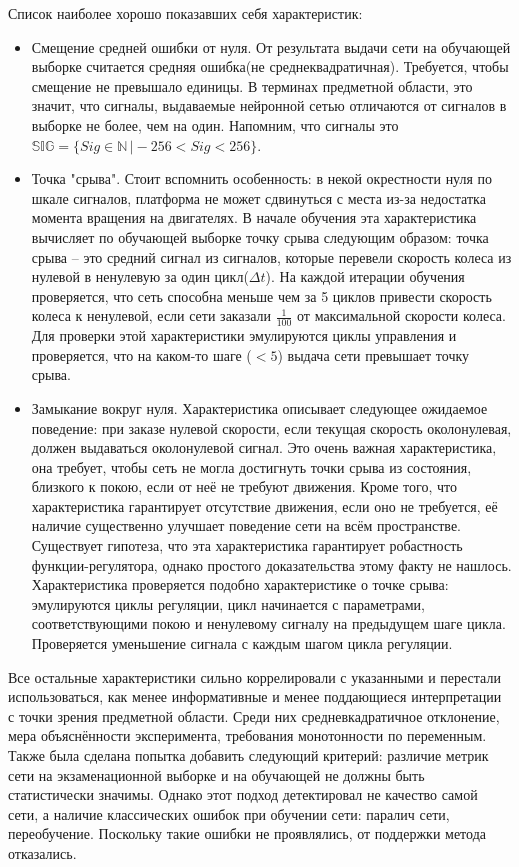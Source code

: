 \documentclass[14pt]{extreport}
\begin{document}
                Список наиболее хорошо показавших себя характеристик:
                    \begin{itemize}
                      \item Смещение средней ошибки от нуля. От результата выдачи сети на обучающей выборке считается средняя ошибка(не среднеквадратичная). Требуется, чтобы смещение не превышало единицы. В терминах предметной области, это значит, что сигналы, выдаваемые нейронной сетью отличаются от сигналов в выборке не более, чем на один. Напомним, что сигналы это $\mathbb{SIG} = \{Sig \in \mathbb{N}\,\vert -256 < Sig < 256\}$.
                      \item Точка "срыва". Стоит вспомнить особенность: в некой окрестности нуля по шкале сигналов, платформа не может сдвинуться с места из-за недостатка момента вращения на двигателях. В начале обучения эта характеристика вычисляет по обучающей выборке точку срыва следующим образом: точка срыва -- это средний сигнал из сигналов, которые перевели скорость колеса из нулевой в ненулевую за один цикл(\(\Delta t\)). На каждой итерации обучения проверяется, что сеть способна меньше чем за 5 циклов привести скорость колеса к ненулевой, если сети заказали $\frac{1}{100}$ от максимальной скорости колеса. Для проверки этой характеристики эмулируются циклы управления и проверяется, что на каком-то шаге ($<5$) выдача сети превышает точку срыва.
                      \item Замыкание вокруг нуля. Характеристика описывает следующее ожидаемое поведение: при заказе нулевой скорости, если текущая скорость околонулевая, должен выдаваться околонулевой сигнал. Это очень важная характеристика, она требует, чтобы сеть не могла достигнуть точки срыва из состояния, близкого к покою, если от неё не требуют движения. Кроме того, что характеристика гарантирует отсутствие движения, если оно не требуется, её наличие существенно улучшает поведение сети на всём пространстве. Существует гипотеза, что эта характеристика гарантирует робастность функции-регулятора, однако простого доказательства этому факту не нашлось. Характеристика проверяется подобно характеристике о точке срыва: эмулируются циклы регуляции, цикл начинается с параметрами, соответствующими покою и ненулевому сигналу на предыдущем шаге цикла. Проверяется уменьшение сигнала с каждым шагом цикла регуляции.
                    \end{itemize}
                Все остальные характеристики сильно коррелировали с указанными и перестали использоваться, как менее информативные и менее поддающиеся интерпретации с точки зрения предметной области. Среди них средневкадратичное отклонение, мера объяснённости эксперимента, требования монотонности по переменным.
                Также была сделана попытка добавить следующий критерий: различие метрик сети на экзаменационной выборке и на обучающей не должны быть статистически значимы. Однако этот подход детектировал не качество самой сети, а наличие классических ошибок при обучении сети: паралич сети, переобучение. Поскольку такие ошибки не проявлялись, от поддержки метода отказались.
\end{document}

